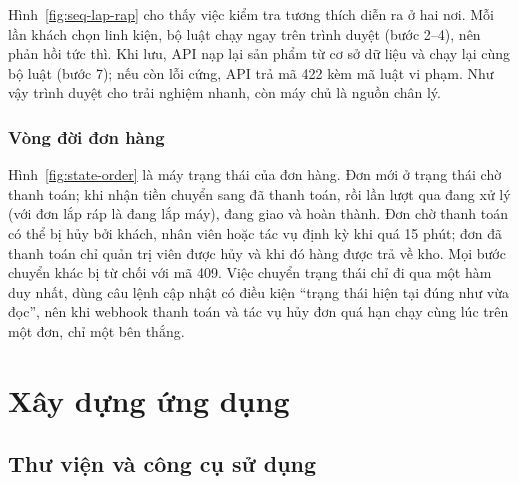 
Hình~\ref{fig:seq-lap-rap} cho thấy việc kiểm tra tương thích diễn ra ở hai nơi. Mỗi lần khách chọn linh kiện, bộ luật chạy ngay trên trình duyệt (bước 2--4), nên phản hồi tức thì. Khi lưu, API nạp lại sản phẩm từ cơ sở dữ liệu và chạy lại cùng bộ luật (bước 7); nếu còn lỗi cứng, API trả mã 422 kèm mã luật vi phạm. Như vậy trình duyệt cho trải nghiệm nhanh, còn máy chủ là nguồn chân lý.

\subsubsection{Vòng đời đơn hàng}


Hình~\ref{fig:state-order} là máy trạng thái của đơn hàng. Đơn mới ở trạng thái chờ thanh toán; khi nhận tiền chuyển sang đã thanh toán, rồi lần lượt qua đang xử lý (với đơn lắp ráp là đang lắp máy), đang giao và hoàn thành. Đơn chờ thanh toán có thể bị hủy bởi khách, nhân viên hoặc tác vụ định kỳ khi quá 15 phút; đơn đã thanh toán chỉ quản trị viên được hủy và khi đó hàng được trả về kho. Mọi bước chuyển khác bị từ chối với mã 409. Việc chuyển trạng thái chỉ đi qua một hàm duy nhất, dùng câu lệnh cập nhật có điều kiện ``trạng thái hiện tại đúng như vừa đọc'', nên khi webhook thanh toán và tác vụ hủy đơn quá hạn chạy cùng lúc trên một đơn, chỉ một bên thắng.

\section{Xây dựng ứng dụng}

\subsection{Thư viện và công cụ sử dụng}

